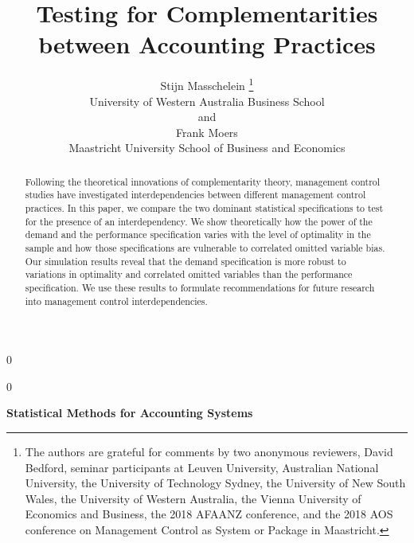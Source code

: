 \documentclass[12pt]{article}
\newcommand{\blind}{0}
\begin{document}
\def\spacingset#1{\renewcommand{\baselinestretch}%
{#1}\small\normalsize} \spacingset{1}


\blind
{
  \title{\bf Testing for Complementarities between Accounting Practices}

  \author{
        Stijn Masschelein \thanks{The authors are grateful for comments by two anonymous reviewers, David Bedford, seminar participants at Leuven University, Australian National University, the University of Technology Sydney, the University of New South Wales, the University of Western Australia, the Vienna University of Economics and Business, the 2018 AFAANZ conference, and the 2018 AOS conference on Management Control as System or Package in Maastricht.} \\
    University of Western Australia Business School\\
     and \\     Frank Moers \\
    Maastricht University School of Business and Economics\\
      }
  \maketitle
} \fi

\blind
{
  \bigskip
  \bigskip
  \bigskip
  \begin{center}
    {\LARGE\bf Statistical Methods for Accounting Systems}
  \end{center}
  \medskip
} \fi

\bigskip
\begin{abstract}
Following the theoretical innovations of complementarity theory, management control studies have investigated interdependencies between different management control practices. In this paper, we compare the two dominant statistical specifications to test for the presence of an interdependency. We show theoretically how the power of the demand and the performance specification varies with the level of optimality in the sample and how those specifications are vulnerable to correlated omitted variable bias. Our simulation results reveal that the demand specification is more robust to variations in optimality and correlated omitted variables than the performance specification. We use these results to formulate recommendations for future research into management control interdependencies.
\end{abstract}
\end{document}

